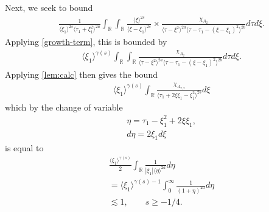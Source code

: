 \documentclass[12pt,reqno]{amsart}
\numberwithin{equation}{section}  %
\numberwithin{figure}{section}
\newcommand{\rr}{\mathbb{R}}
\theoremstyle{plain}
\theoremstyle{definition}
\theoremstyle{remark}
\begin{document}
%
%
Next, we seek to bound
\begin{equation*}
\begin{split}
  &  \frac{1}{\langle \xi_{1} \rangle ^{2s}
  \langle \tau_{1} + \xi_{1}^{2}  \rangle
  ^{2a}} \int_{\rr} \int_{\rr} \frac{\langle \xi \rangle ^{2s}}{\langle
  \xi - \xi_{1}\rangle ^{2s}}  \times \frac{\chi_{A_{2}}}{\langle
  \tau - \xi^{2} \rangle ^{2a} \langle \tau - \tau_{1} - (\xi -
  \xi_{1})^{2} \rangle ^{2b}} d \tau d \xi.
\end{split}
\end{equation*}
Applying \eqref{growth-term}, this is bounded by
\begin{equation*}
\begin{split}
  &  \langle \xi_{1} \rangle ^{\gamma(s)}
   \int_{\rr} \int_{\rr} \frac{\chi_{A_{2}}}{\langle
  \tau - \xi^{2} \rangle ^{2a} \langle \tau - \tau_{1} - (\xi -
  \xi_{1})^{2} \rangle ^{2b}} d \tau d \xi.
\end{split}
\end{equation*}
Applying \autoref{lem:calc} then gives the bound
\begin{equation*}
\begin{split}
  & \langle \xi_{1} \rangle ^{\gamma(s)} \int_{\rr} \frac{\chi_{A_{2,2}} }{\langle
  \tau_{1} + 2 \xi \xi_{1} - \xi_{1}^{2} \rangle ^{2b}} d \xi
\end{split}
\end{equation*}
which by the change of variable
%
%
\begin{equation*}
\begin{split}
  & \eta = \tau_{1} - \xi_{1}^{2} + 2 \xi \xi_{1},
  \\
  & d \eta = 2 \xi_{1} d \xi
\end{split}
\end{equation*}
%
%
is equal to
%
%
\begin{equation*}
\begin{split}
  & \frac{\langle \xi_{1} \rangle^{\gamma(s)}}{2}  \int_{\rr} 
  \frac{1}{| \xi_{1} |\langle \eta \rangle ^{2a} }d \eta
  \\
  & = \langle \xi_{1} \rangle ^{\gamma(s) -1} \int_{0}^{\infty} \frac{1}{(1 + \eta
  )^{2a}}d \eta
  \\
  & \lesssim 1, \qquad s \ge -1/4.
\end{split}
\end{equation*}
\end{document}
